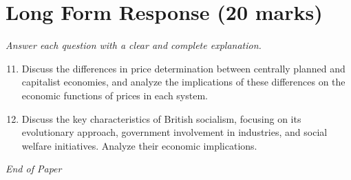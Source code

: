\documentclass[12pt]{article}
\begin{document}
\section*{Long Form Response (20 marks)}
\textit{Answer each question with a clear and complete explanation.}
\begin{enumerate}[label=\arabic*.]
\setcounter{enumi}{10}
\item Discuss the differences in price determination between centrally planned and capitalist economies, and analyze the implications of these differences on the economic functions of prices in each system.
\item Discuss the key characteristics of British socialism, focusing on its evolutionary approach, government involvement in industries, and social welfare initiatives. Analyze their economic implications.
\end{enumerate}

\vfill
\noindent\textit{End of Paper}
\end{document}
